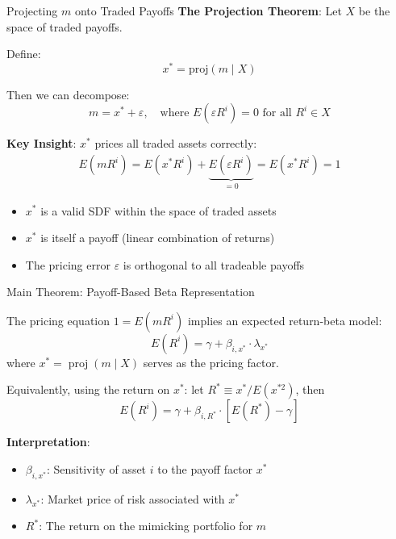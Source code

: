 \documentclass{beamer}
\begin{document}
\begin{frame}{Projecting $m$ onto Traded Payoffs}
	\textbf{The Projection Theorem}: Let $X$ be the space of traded payoffs. 
 
 Define:
	\begin{equation*}
		x^* = \text{proj}(m \mid X)
	\end{equation*}
	
	Then we can decompose:
	\begin{equation*}
		m = x^* + \varepsilon, \quad \text{where } E(\varepsilon R^i) = 0 \text{ for all } R^i \in X
	\end{equation*}
	
	\vspace{5pt}
	\textbf{Key Insight}: $x^*$ prices all traded assets correctly:
	\begin{align*}
		E(mR^i) = E(x^*R^i) + \underbrace{E(\varepsilon R^i)}_{=0} = E(x^*R^i) = 1
	\end{align*}
	
	\vspace{5pt}
	\begin{itemize}
		\item $x^*$ is a \alert{valid SDF} within the space of traded assets
		\item $x^*$ is itself a payoff (linear combination of returns)
		\item The pricing error $\varepsilon$ is orthogonal to all tradeable payoffs
	\end{itemize}
\end{frame}

\begin{frame}{Main Theorem: Payoff-Based Beta Representation}
	\begin{theorem}
		The pricing equation $1 = E(mR^i)$ implies an expected return-beta model:
		\begin{equation*}
			E(R^i) = \gamma + \beta_{i,x^*} \cdot \lambda_{x^*}
		\end{equation*}
		where $x^* = \operatorname{proj}(m \mid X)$ serves as the pricing factor.
		
		\vspace{8pt}
		Equivalently, using the return on $x^*$: let $R^* \equiv x^*/E(x^{*2})$, then
		\begin{equation*}
			E(R^i) = \gamma + \beta_{i,R^*} \cdot [E(R^*) - \gamma]
		\end{equation*}
	\end{theorem}
	
	\vspace{5pt}
	\textbf{Interpretation}:
	\begin{itemize}
		\item $\beta_{i,x^*}$: Sensitivity of asset $i$ to the payoff factor $x^*$
		\item $\lambda_{x^*}$: Market price of risk associated with $x^*$
		\item $R^*$: The return on the mimicking portfolio for $m$
	\end{itemize}
\end{frame}
\end{document}
